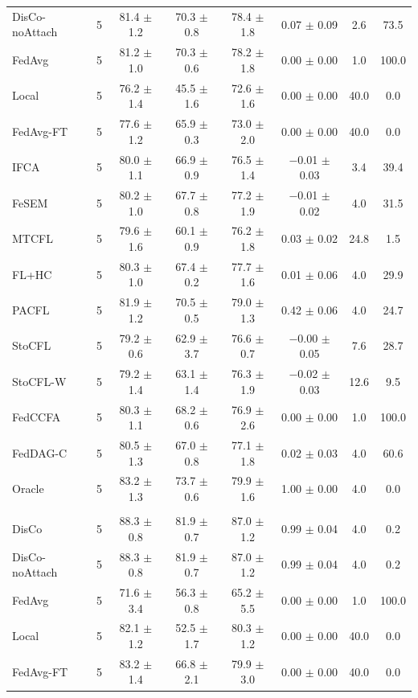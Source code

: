 {\begin{tabular}{l r c c c c c c}
DisCo-noAttach & 5 & 81.4 $\pm$ 1.2 & 70.3 $\pm$ 0.8 & 78.4 $\pm$ 1.8 & 0.07 $\pm$ 0.09 & 2.6 & 73.5 \\
FedAvg & 5 & 81.2 $\pm$ 1.0 & 70.3 $\pm$ 0.6 & 78.2 $\pm$ 1.8 & 0.00 $\pm$ 0.00 & 1.0 & 100.0 \\
Local & 5 & 76.2 $\pm$ 1.4 & 45.5 $\pm$ 1.6 & 72.6 $\pm$ 1.6 & 0.00 $\pm$ 0.00 & 40.0 & 0.0 \\
FedAvg-FT & 5 & 77.6 $\pm$ 1.2 & 65.9 $\pm$ 0.3 & 73.0 $\pm$ 2.0 & 0.00 $\pm$ 0.00 & 40.0 & 0.0 \\
IFCA & 5 & 80.0 $\pm$ 1.1 & 66.9 $\pm$ 0.9 & 76.5 $\pm$ 1.4 & $-$0.01 $\pm$ 0.03 & 3.4 & 39.4 \\
FeSEM & 5 & 80.2 $\pm$ 1.0 & 67.7 $\pm$ 0.8 & 77.2 $\pm$ 1.9 & $-$0.01 $\pm$ 0.02 & 4.0 & 31.5 \\
MTCFL & 5 & 79.6 $\pm$ 1.6 & 60.1 $\pm$ 0.9 & 76.2 $\pm$ 1.8 & 0.03 $\pm$ 0.02 & 24.8 & 1.5 \\
FL+HC & 5 & 80.3 $\pm$ 1.0 & 67.4 $\pm$ 0.2 & 77.7 $\pm$ 1.6 & 0.01 $\pm$ 0.06 & 4.0 & 29.9 \\
PACFL & 5 & 81.9 $\pm$ 1.2 & 70.5 $\pm$ 0.5 & 79.0 $\pm$ 1.3 & 0.42 $\pm$ 0.06 & 4.0 & 24.7 \\
StoCFL & 5 & 79.2 $\pm$ 0.6 & 62.9 $\pm$ 3.7 & 76.6 $\pm$ 0.7 & $-$0.00 $\pm$ 0.05 & 7.6 & 28.7 \\
StoCFL-W & 5 & 79.2 $\pm$ 1.4 & 63.1 $\pm$ 1.4 & 76.3 $\pm$ 1.9 & $-$0.02 $\pm$ 0.03 & 12.6 & 9.5 \\
FedCCFA & 5 & 80.3 $\pm$ 1.1 & 68.2 $\pm$ 0.6 & 76.9 $\pm$ 2.6 & 0.00 $\pm$ 0.00 & 1.0 & 100.0 \\
FedDAG-C & 5 & 80.5 $\pm$ 1.3 & 67.0 $\pm$ 0.8 & 77.1 $\pm$ 1.8 & 0.02 $\pm$ 0.03 & 4.0 & 60.6 \\
Oracle & 5 & 83.2 $\pm$ 1.3 & 73.7 $\pm$ 0.6 & 79.9 $\pm$ 1.6 & 1.00 $\pm$ 0.00 & 4.0 & 0.0 \\
\addlinespace
\multicolumn{8}{l}{\textit{CIFAR-10 (ResNet) label swap}} \\
DisCo & 5 & 88.3 $\pm$ 0.8 & 81.9 $\pm$ 0.7 & 87.0 $\pm$ 1.2 & 0.99 $\pm$ 0.04 & 4.0 & 0.2 \\
DisCo-noAttach & 5 & 88.3 $\pm$ 0.8 & 81.9 $\pm$ 0.7 & 87.0 $\pm$ 1.2 & 0.99 $\pm$ 0.04 & 4.0 & 0.2 \\
FedAvg & 5 & 71.6 $\pm$ 3.4 & 56.3 $\pm$ 0.8 & 65.2 $\pm$ 5.5 & 0.00 $\pm$ 0.00 & 1.0 & 100.0 \\
Local & 5 & 82.1 $\pm$ 1.2 & 52.5 $\pm$ 1.7 & 80.3 $\pm$ 1.2 & 0.00 $\pm$ 0.00 & 40.0 & 0.0 \\
FedAvg-FT & 5 & 83.2 $\pm$ 1.4 & 66.8 $\pm$ 2.1 & 79.9 $\pm$ 3.0 & 0.00 $\pm$ 0.00 & 40.0 & 0.0 \\

\end{tabular}}
